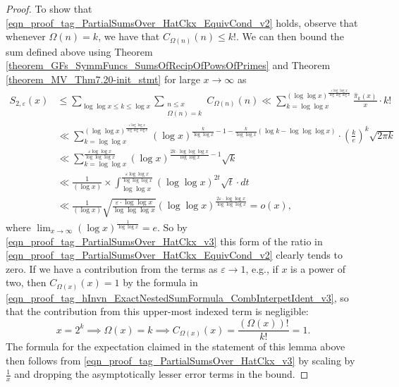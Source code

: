 \documentclass[11pt,reqno,a4letter]{article}
\numberwithin{figure}{section}
\numberwithin{table}{section}
\theoremstyle{plain}
\numberwithin{theorem}{section}
\theoremstyle{definition}
\begin{document}
\begin{proof}
To show that \eqref{eqn_proof_tag_PartialSumsOver_HatCkx_EquivCond_v2} holds, 
observe that whenever $\Omega(n) = k$, we have that $C_{\Omega(n)}(n) \leq k!$. 
We can then bound the sum defined above using 
Theorem \ref{theorem_GFs_SymmFuncs_SumsOfRecipOfPowsOfPrimes} and 
Theorem \ref{theorem_MV_Thm7.20-init_stmt} for large $x \rightarrow \infty$ as 
\begin{align*} 
S_{2,\varepsilon}(x) & \leq 
     \sum_{\log\log x \leq k \leq \log x} \sum_{\substack{n \leq x \\ \Omega(n)=k}} C_{\Omega(n)}(n) 
     \ll \sum_{k=\log\log x}^{(\log\log x)^{\frac{\varepsilon \log\log x}{\log\log\log x}}} 
      \frac{\widehat{\pi}_k(x)}{x} \cdot k! \\ 
     & \ll \sum_{k=\log\log x}^{(\log\log x)^{\frac{\varepsilon \log\log x}{\log\log\log x}}} 
     (\log x)^{\frac{k}{\log\log x} - 1 - \frac{k}{\log\log x} \left( 
     \log k - \log\log\log x\right)} \cdot \left(\frac{k}{e}\right)^{k} \sqrt{2\pi k} \\ 
     & \ll \sum_{k=\log\log x}^{\frac{\varepsilon \log\log x}{\log\log\log x}} 
     (\log x)^{\frac{2k \cdot \log\log\log x}{\log\log x} - 1} \sqrt{k} \\ 
     & \ll \frac{1}{(\log x)} \times \int_{\log\log x}^{ 
     \frac{\varepsilon \log\log x}{\log\log\log x}} (\log\log x)^{2t} \sqrt{t} \cdot dt \\ 
     & \ll \frac{1}{(\log x)} \sqrt{\frac{\varepsilon \cdot \log\log x}{\log\log\log x}} 
     (\log\log x)^{\frac{2\varepsilon \cdot \log\log x}{\log\log\log x}} = o(x), 
\end{align*} 
where $\lim_{x \rightarrow \infty} (\log x)^{\frac{1}{\log\log x}} = e$. 
So by \eqref{eqn_proof_tag_PartialSumsOver_HatCkx_v3} this 
form of the ratio in \eqref{eqn_proof_tag_PartialSumsOver_HatCkx_EquivCond_v2} clearly tends to zero. 
If we have a contribution from the terms as $\varepsilon \rightarrow 1$, 
e.g., if $x$ is a power of two, then $C_{\Omega(x)}(x) = 1$ by the formula in 
\eqref{eqn_proof_tag_hInvn_ExactNestedSumFormula_CombInterpetIdent_v3}, so that 
the contribution from this upper-most indexed term is negligible: 
\[
x=2^k \implies \Omega(x) = k \implies C_{\Omega(x)}(x) = \frac{(\Omega(x))!}{k!} = 1. 
\]
The formula for the expectation claimed in the statement of this lemma above then 
follows from \eqref{eqn_proof_tag_PartialSumsOver_HatCkx_v3} by scaling by 
$\frac{1}{x}$ and dropping the asymptotically lesser error terms in the bound. 
\end{proof} 
\end{document}
